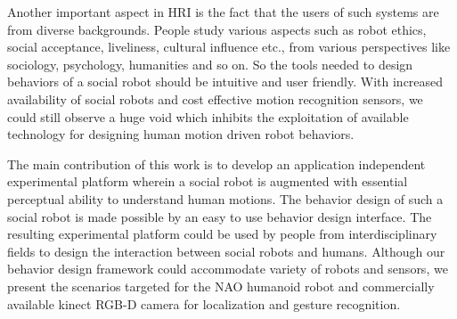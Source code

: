 \documentclass{llncs}
\begin{document}
%
	Another important aspect in HRI is the fact that the users of such systems are from diverse backgrounds. People study various aspects such as robot ethics, social acceptance, liveliness, cultural influence etc., from various perspectives like sociology, psychology, humanities and so on. So the tools needed to design behaviors of a social robot should be intuitive and user friendly.  With increased availability of social robots and cost effective motion recognition sensors, we could still observe a huge void which inhibits the exploitation of available technology for designing human motion driven robot behaviors.

	The main contribution of this work is to develop an application independent experimental platform wherein a social robot is augmented with essential perceptual ability to understand human motions. The behavior design of such a social robot is made possible by an easy to use behavior design interface. The resulting experimental platform could be used by people from interdisciplinary fields to design the interaction between social robots and humans. Although our behavior design framework could accommodate variety of robots and sensors, we present the scenarios targeted for the NAO \cite{NaoRobot} humanoid robot and commercially available kinect \cite{Kinect2014} RGB-D camera for localization and gesture recognition. 
\end{document}
